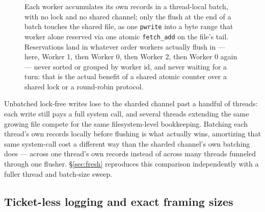 \documentclass[11pt]{article}
\newcommand{\code}[1]{\texttt{#1}}
\begin{document}
\begin{figure}[h]
\caption{Each worker accumulates its own records in a thread-local batch, with no
  lock and no shared channel; only the flush at the end of a batch touches the
  shared file, as one \code{pwrite} into a byte range that worker alone reserved via
  one atomic \code{fetch\_add} on the file's tail. Reservations land in whatever
  order workers actually flush in --- here, Worker 1, then Worker 0, then Worker 2,
  then Worker 0 again --- never sorted or grouped by worker id, and never waiting
  for a turn: that is the actual benefit of a shared atomic counter over a shared
  lock or a round-robin protocol.}
\label{fig:wal-lockfree}
\end{figure}

Unbatched lock-free writes lose to the sharded channel past a handful of threads:
each write still pays a full system call, and several threads extending the same
growing file compete for the same filesystem-level bookkeeping. Batching each
thread's own records locally before flushing is what actually wins, amortizing that
same system-call cost a different way than the sharded channel's own batching does
--- across one thread's own records instead of across many threads funneled through
one flusher. \S\ref{sec:fresh} reproduces this comparison independently with a fuller
thread and batch-size sweep.

\subsection{Ticket-less logging and exact framing sizes}
\end{document}
